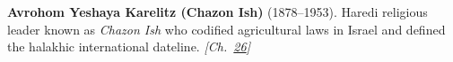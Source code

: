 \textbf{Avrohom Yeshaya Karelitz (Chazon Ish)} (1878–1953). Haredi religious leader known as \emph{Chazon Ish} who codified agricultural laws in Israel and defined the halakhic international dateline. \emph{[Ch.~\hyperref[ch:jewishcalendar]{26}]}

